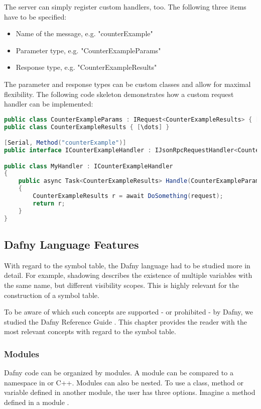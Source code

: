 The server can simply register custom handlers, too. The following three items have to be specified:
\begin{itemize}
    \item Name of the message, e.g. "counterExample"
    \item Parameter type, e.g. "CounterExampleParams"
    \item Response type, e.g. "CounterExampleResults"
\end{itemize}


The parameter and response types can be custom classes and allow for maximal flexibility. The following code skeleton demonstrates how a custom request handler can be implemented:

\begin{lstlisting}[language=csharp, caption={LSP Handler Implementation}, captionpos=b, label={lst:lspcustomhandler}]
public class CounterExampleParams : IRequest<CounterExampleResults> { [\dots] }
public class CounterExampleResults { [\dots] }

[Serial, Method("counterExample")]
public interface ICounterExampleHandler : IJsonRpcRequestHandler<CounterExampleParams, CounterExampleResults> { }

public class MyHandler : ICounterExampleHandler
{
    public async Task<CounterExampleResults> Handle(CounterExampleParams request, CancellationToken c)
    {
        CounterExampleResults r = await DoSomething(request);
        return r;
    }
}
\end{lstlisting}



\subsection{Dafny Language Features}
With regard to the symbol table, the Dafny language had to be studied more in detail. For example, shadowing describes the existence of multiple variables with the same name, but different visibility scopes. This is highly relevant for the construction of a symbol table.

To be aware of which such concepts are supported - or prohibited - by Dafny, we studied the Dafny Reference Guide \cite{dafnyReferenceManual}. This chapter provides the reader with the most relevant concepts with regard to the symbol table. 


\subsubsection{Modules}
Dafny code can be organized by modules. A module can be compared to a namespace in \Csharp or C++. Modules can also be nested. To use a class, method or variable defined in another module, the user has three options. Imagine a method  defined in a module .


